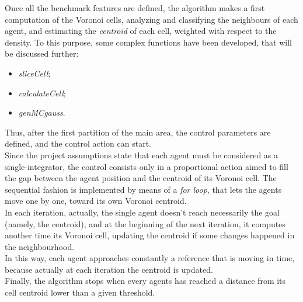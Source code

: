 \documentclass[a4paper,11pt,oneside]{book}
\begin{document}
Once all the benchmark features are defined, the algorithm makes a first computation of the Voronoi cells, analyzing and classifying the neighbours of each agent, and estimating the \textit{centroid} of each cell, weighted with respect to the density. To this purpose, some complex functions have been developed, that will be discussed further:
\begin{itemize}
	\item \textit{sliceCell};
	\item \textit{calculateCell};
	\item \textit{genMCgauss}.
\end{itemize}
Thus, after the first partition of the main area, the control parameters are defined, and the control action can start.\\
Since the project assumptions state that each agent must be considered as a single-integrator, the control consists only in a proportional action aimed to fill the gap between the agent position and the centroid of its Voronoi cell. The sequential fashion is implemented by means of a \textit{for loop}, that lets the agents move one by one, toward its own Voronoi centroid.\\
In each iteration, actually, the single agent doesn't reach necessarily the goal (namely, the centroid), and at the beginning of the next iteration, it computes another time its Voronoi cell, updating the centroid if some changes happened in the neighbourhood.\\
In this way, each agent approaches constantly a reference that is moving in time, because actually at each iteration the centroid is updated. \\
Finally, the algorithm stops when every agents has reached a distance from its cell centroid lower than a given threshold.\\	
\end{document}
